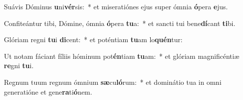 \item Suávis Dóminus \textbf{u}ni\textbf{vér}sis:~* et miseratiónes ejus super ómnia \textbf{ó}pera \textbf{e}jus.
\item Confiteántur tibi, Dómine, ómnia \textbf{ó}pera \textbf{tu}a:~* et sancti tui bene\textbf{dí}cant \textbf{ti}bi.
\item Glóriam regni \textbf{tu}i \textbf{di}cent:~* et poténtiam \textbf{tu}am lo\textbf{quén}tur:
\item Ut notam fáciant fíliis hóminum pot\textbf{én}tiam \textbf{tu}am:~* et glóriam magnificéntiæ \textbf{re}gni \textbf{tu}i.
\item Regnum tuum regnum ómnium \textbf{sæ}cu\textbf{ló}rum:~* et dominátio tua in omni generatióne et gene\textbf{ra}ti\textbf{ó}nem.

